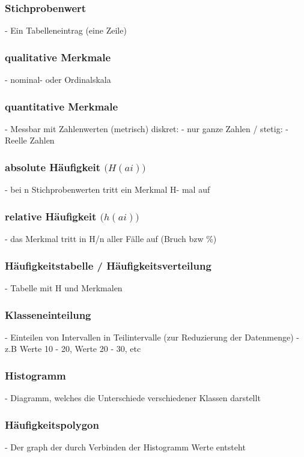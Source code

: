\documentclass[a4paper,12pt]{article}
\begin{document}
\subsubsection{Stichprobenwert}
    - Ein Tabelleneintrag (eine Zeile)
        
\subsubsection{qualitative Merkmale}
    - nominal- oder Ordinalskala
    
\subsubsection{quantitative Merkmale}
    - Messbar mit Zahlenwerten (metrisch)
    diskret: - nur ganze Zahlen / stetig: - Reelle Zahlen

\subsubsection{absolute Häufigkeit $\Big(H(ai)\Big)$}
    - bei n Stichprobenwerten tritt ein Merkmal H- mal auf
    
\subsubsection{relative Häufigkeit $\Big(h(ai)\Big)$}
    - das Merkmal tritt in H/n aller Fälle auf (Bruch bzw \%)
    
\subsubsection{Häufigkeitstabelle / Häufigkeitsverteilung}
    - Tabelle mit H und Merkmalen
    
\subsubsection{Klasseneinteilung}
    - Einteilen von Intervallen in Teilintervalle (zur Reduzierung der 
        Datenmenge)
    - z.B Werte 10 - 20, Werte 20 - 30, etc
\subsubsection{Histogramm}
    - Diagramm, welches die Unterschiede verschiedener Klassen darstellt
    
\subsubsection{Häufigkeitspolygon}
    - Der graph der durch Verbinden der Histogramm Werte entsteht
    
\end{document}

